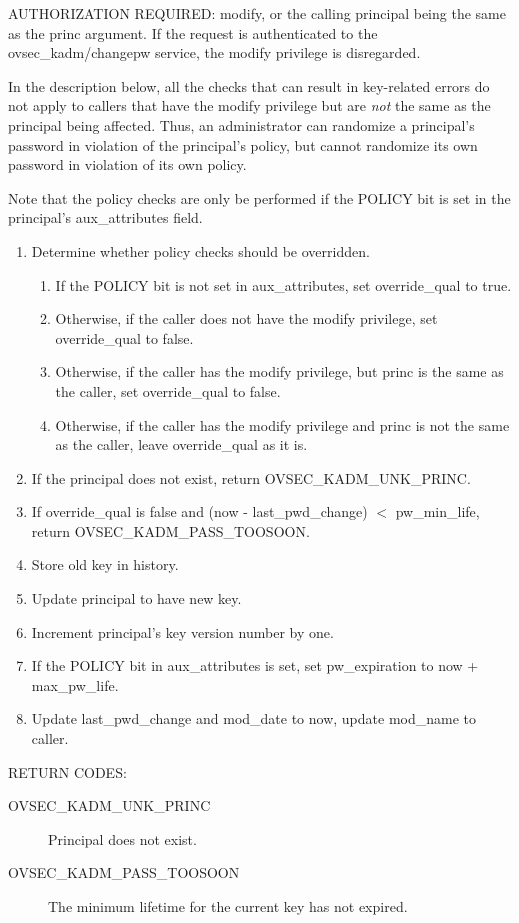 AUTHORIZATION REQUIRED: modify, or the calling principal being the
same as the princ argument.  If the request is authenticated to the
ovsec_kadm/changepw service, the modify privilege is disregarded.

In the description below, all the checks that can result in
key-related errors do not apply to callers that have the modify
privilege but are {\it not} the same as the principal being affected.
Thus, an administrator can randomize a principal's password in
violation of the principal's policy, but cannot randomize its own
password in violation of its own policy.

Note that the policy checks are only be performed if the POLICY bit is
set in the principal's aux_attributes field.

\begin{enumerate}
\item Determine whether policy checks should be overridden.
\begin{enumerate}
\item If the POLICY bit is not set in aux_attributes, set
override_qual to true.
\item Otherwise, if the caller does not have the modify privilege,
set override_qual to false.
\item Otherwise, if the caller has the modify privilege, but princ is the
same as the caller, set override_qual to false.
\item Otherwise, if the caller has the modify privilege and princ is
not the same as the caller, leave override_qual as it is.
\end{enumerate}
\item If the principal does not exist, return OVSEC_KADM_UNK_PRINC.
\item If override_qual is false and (now - last_pwd_change) $<$
pw_min_life, return OVSEC_KADM_PASS_TOOSOON.
\item Store old key in history.
\item Update principal to have new key.
\item Increment principal's key version number by one.
\item If the POLICY bit in aux_attributes is set, set pw_expiration to
now + max_pw_life.
\item Update last_pwd_change and mod_date to now, update mod_name to
caller.
\end{enumerate}

RETURN CODES:

\begin{description}
\item[OVSEC_KADM_UNK_PRINC] Principal does not exist.
\item[OVSEC_KADM_PASS_TOOSOON] The minimum lifetime for the current
key has not expired.
\end{description}

